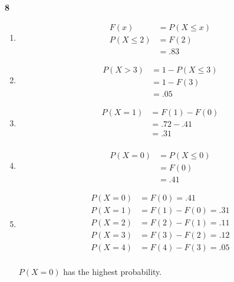 \documentclass[12pt]{report}
\begin{document}
{\bf 8}
\begin{enumerate}[label={\bf \alph*}]
\item 
\begin{align*}
F(x)&=P(X \leq x) \\
P(X \leq 2) &= F(2)\\
&=.83
\end{align*}
\item 
\begin{align*}
P(X > 3)&=1-P(X \leq 3)\\
&= 1-F(3)\\
&=.05
\end{align*}
\item 
\begin{align*}
P(X =1)&=F(1)-F(0)\\
&= .72 -.41 \\
&=.31\\
\end{align*}
\item
\begin{align*}
P(X =0)&=P( X \leq 0)\\
&=F(0)\\
&=.41
\end{align*}
\item
\begin{align*}
P(X =0)&=F(0) = .41\\
P(X=1)&=F(1)-F(0)=.31\\
P(X=2)&=F(2)-F(1)=.11\\
P(X=3)&=F(3)-F(2)=.12\\
P(X=4)&=F(4)-F(3)=.05\\
\end{align*}

\par $P(X=0)$ has the highest probability. 
\end{enumerate}
\end{document}
